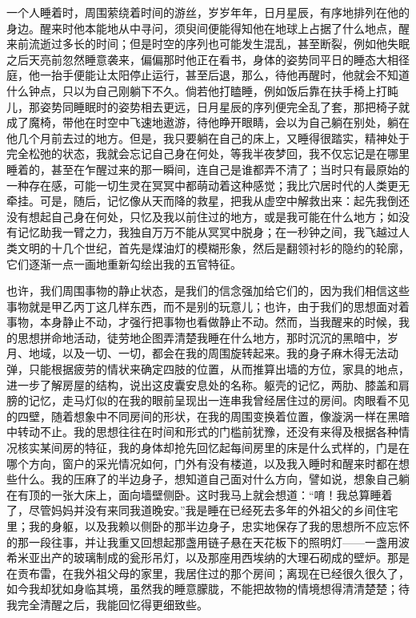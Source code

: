 \par 一个人睡着时，周围萦绕着时间的游丝，岁岁年年，日月星辰，有序地排列在他的身边。醒来时他本能地从中寻问，须臾间便能得知他在地球上占据了什么地点，醒来前流逝过多长的时间；但是时空的序列也可能发生混乱，甚至断裂，例如他失眠之后天亮前忽然睡意袭来，偏偏那时他正在看书，身体的姿势同平日的睡态大相径庭，他一抬手便能让太阳停止运行，甚至后退，那么，待他再醒时，他就会不知道什么钟点，只以为自己刚躺下不久。倘若他打瞌睡，例如饭后靠在扶手椅上打盹儿，那姿势同睡眠时的姿势相去更远，日月星辰的序列便完全乱了套，那把椅子就成了魔椅，带他在时空中飞速地遨游，待他睁开眼睛，会以为自己躺在别处，躺在他几个月前去过的地方。但是，我只要躺在自己的床上，又睡得很踏实，精神处于完全松弛的状态，我就会忘记自己身在何处，等我半夜梦回，我不仅忘记是在哪里睡着的，甚至在乍醒过来的那一瞬间，连自己是谁都弄不清了；当时只有最原始的一种存在感，可能一切生灵在冥冥中都萌动着这种感觉；我比穴居时代的人类更无牵挂。可是，随后，记忆像从天而降的救星，把我从虚空中解救出来：起先我倒还没有想起自己身在何处，只忆及我以前住过的地方，或是我可能在什么地方；如没有记忆助我一臂之力，我独自万万不能从冥冥中脱身；在一秒钟之间，我飞越过人类文明的十几个世纪，首先是煤油灯的模糊形象，然后是翻领衬衫的隐约的轮廓，它们逐渐一点一画地重新勾绘出我的五官特征。
\par 也许，我们周围事物的静止状态，是我们的信念强加给它们的，因为我们相信这些事物就是甲乙丙丁这几样东西，而不是别的玩意儿；也许，由于我们的思想面对着事物，本身静止不动，才强行把事物也看做静止不动。然而，当我醒来的时候，我的思想拼命地活动，徒劳地企图弄清楚我睡在什么地方，那时沉沉的黑暗中，岁月、地域，以及一切、一切，都会在我的周围旋转起来。我的身子麻木得无法动弹，只能根据疲劳的情状来确定四肢的位置，从而推算出墙的方位，家具的地点，进一步了解房屋的结构，说出这皮囊安息处的名称。躯壳的记忆，两肋、膝盖和肩膀的记忆，走马灯似的在我的眼前呈现出一连串我曾经居住过的房间。肉眼看不见的四壁，随着想象中不同房间的形状，在我的周围变换着位置，像漩涡一样在黑暗中转动不止。我的思想往往在时间和形式的门槛前犹豫，还没有来得及根据各种情况核实某间房的特征，我的身体却抢先回忆起每间房里的床是什么式样的，门是在哪个方向，窗户的采光情况如何，门外有没有楼道，以及我入睡时和醒来时都在想些什么。我的压麻了的半边身子，想知道自己面对什么方向，譬如说，想象自己躺在有顶的一张大床上，面向墙壁侧卧。这时我马上就会想道：“唷！我总算睡着了，尽管妈妈并没有来同我道晚安。”我是睡在已经死去多年的外祖父的乡间住宅里；我的身躯，以及我赖以侧卧的那半边身子，忠实地保存了我的思想所不应忘怀的那一段往事，并让我重又回想起那盏用链子悬在天花板下的照明灯——一盏用波希米亚出产的玻璃制成的瓮形吊灯，以及那座用西埃纳的大理石砌成的壁炉。那是在贡布雷，在我外祖父母的家里，我居住过的那个房间；离现在已经很久很久了，如今我却犹如身临其境，虽然我的睡意朦胧，不能把故物的情境想得清清楚楚；待我完全清醒之后，我能回忆得更细致些。
